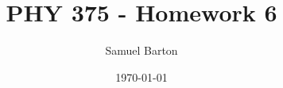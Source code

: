 \documentclass[12pt]{article}
\title{PHY 375 - Homework 6}
\author{Samuel Barton}
\date{\today}
\begin{document}
	
	\maketitle

	
	
	\pagebreak
	
	
	
\end{document}
